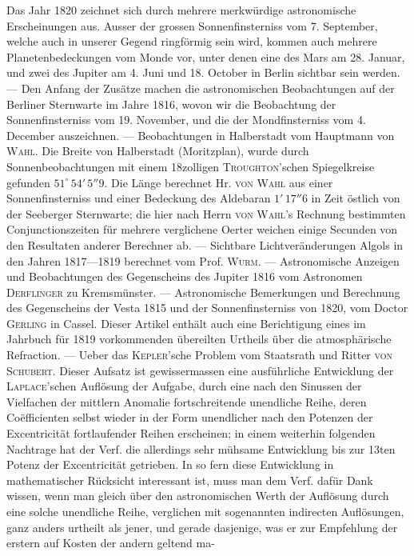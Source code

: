 Das Jahr 1820 zeichnet sich durch mehrere merkwürdige astronomische Erscheinungen aus. Ausser der grossen Sonnenfinsterniss vom 7. September, welche auch in unserer Gegend ringförmig sein wird, kommen auch mehrere Planetenbedeckungen vom Monde vor, unter denen eine des Mars am 28. Januar, und zwei des Jupiter am 4. Juni und 18. October in Berlin sichtbar sein werden. --- Den Anfang der Zusätze machen die astronomischen Beobachtungen auf der Berliner Sternwarte im Jahre 1816, wovon wir die Beobachtung der Sonnenfinsterniss vom 19. November, und die der Mondfinsterniss vom 4. December auszeichnen. --- Beobachtungen in Halberstadt vom Hauptmann von \textsc{Wahl}. Die Breite von Halberstadt (Moritzplan), wurde durch Sonnenbeobachtungen mit einem 18zolligen \textsc{Troughton}'schen Spiegelkreise gefunden $51^\circ\,54'\,5''9$. Die Länge berechnet Hr. \textsc{von Wahl} aus einer Sonnenfinsterniss und einer Bedeckung des Aldebaran $1'\,17''6$ in Zeit östlich von der Seeberger Sternwarte; die hier nach Herrn \textsc{von Wahl}'s Rechnung bestimmten Conjunctionszeiten für mehrere verglichene Oerter weichen einige Secunden von den Resultaten anderer Berechner ab. --- Sichtbare Lichtveränderungen Algols in den Jahren 1817---1819 berechnet vom Prof. \textsc{Wurm}. --- Astronomische Anzeigen und Beobachtungen des Gegenscheins des Jupiter 1816 vom Astronomen \textsc{Derflinger} zu Kremsmünster. --- Astronomische Bemerkungen und Berechnung des Gegenscheins der Vesta 1815 und der Sonnenfinsterniss von 1820, vom Doctor \textsc{Gerling} in Cassel. Dieser Artikel enthält auch eine Berichtigung eines im Jahrbuch für 1819 vorkommenden übereilten Urtheils über die atmosphärische Refraction. --- Ueber das \textsc{Kepler}'sche Problem vom Staatsrath und Ritter \textsc{von Schubert}. Dieser Aufsatz ist gewissermassen eine ausführliche Entwicklung der \textsc{Laplace}'schen Auflösung der Aufgabe, durch eine nach den Sinussen der Vielfachen der mittlern Anomalie fortschreitende unendliche Reihe, deren Coëfficienten selbst wieder in der Form unendlicher nach den Potenzen der Excentricität fortlaufender Reihen erscheinen; in einem weiterhin folgenden Nachtrage hat der Verf. die allerdings sehr mühsame Entwicklung bis zur 13ten Potenz der Excentricität getrieben. In so fern diese Entwicklung in mathematischer Rücksicht interessant ist, muss man dem Verf. dafür Dank wissen, wenn man gleich über den astronomischen Werth der Auflösung durch eine solche unendliche Reihe, verglichen mit sogenannten indirecten Auflösungen, ganz anders urtheilt als jener, und gerade dasjenige, was er zur Empfehlung der erstern auf Kosten der andern geltend ma-\par

